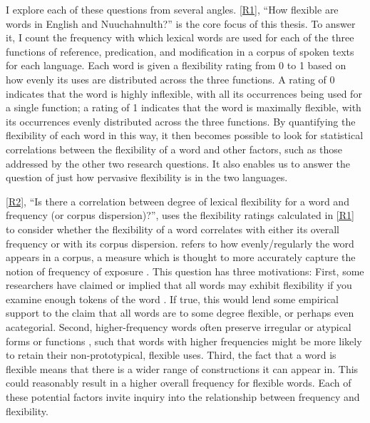 I explore each of these questions from several angles. \ref{R1}, \enquote{How flexible are words in English and Nuuchahnulth?} is the core focus of this thesis. To answer it, I count the frequency with which lexical words are used for each of the three functions of reference, predication, and modification in a corpus of spoken texts for each language. Each word is given a flexibility rating from 0 to 1 based on how evenly its uses are distributed across the three functions. A rating of 0 indicates that the word is highly inflexible, with all its occurrences being used for a single function; a rating of 1 indicates that the word is maximally flexible, with its occurrences evenly distributed across the three functions. By quantifying the flexibility of each word in this way, it then becomes possible to look for statistical correlations between the flexibility of a word and other factors, such as those addressed by the other two research questions. It also enables us to answer the question of just how pervasive flexibility is in the two languages.

\ref{R2}, \enquote{Is there a correlation between degree of lexical flexibility for a word and frequency (or corpus dispersion)?}, uses the flexibility ratings calculated in \ref{R1} to consider whether the flexibility of a word correlates with either its overall frequency or with its corpus dispersion.  refers to how evenly/regularly the word appears in a corpus, a measure which is thought to more accurately capture the notion of frequency of exposure \parencites{Gries2008}{Griesforthcoming}. This question has three motivations: First, some researchers have claimed or implied that all words may exhibit flexibility if you examine enough tokens of the word \parencite[77]{MoselHovdhaugen1992}. If true, this would lend some empirical support to the claim that all words are to some degree flexible, or perhaps even acategorial. Second, higher-frequency words often preserve irregular or atypical forms or functions \parencite[Ch.~13]{Bybee2007}, such that words with higher frequencies might be more likely to retain their non-prototypical, flexible uses. Third, the fact that a word is flexible means that there is a wider range of constructions it can appear in. This could reasonably result in a higher overall frequency for flexible words. Each of these potential factors invite inquiry into the relationship between frequency and flexibility.

